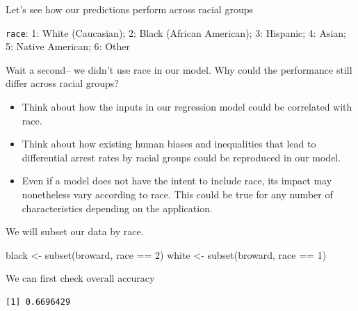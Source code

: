 \documentclass[
  letterpaper,
  DIV=11,
  numbers=noendperiod]{scrreprt}
\newenvironment{Shaded}{\begin{snugshade}}{\end{snugshade}}
\newcommand{\DecValTok}[1]{\textcolor[rgb]{0.68,0.00,0.00}{#1}}
\newcommand{\FunctionTok}[1]{\textcolor[rgb]{0.28,0.35,0.67}{#1}}
\newcommand{\NormalTok}[1]{\textcolor[rgb]{0.00,0.23,0.31}{#1}}
\newcommand{\OtherTok}[1]{\textcolor[rgb]{0.00,0.23,0.31}{#1}}
\newcommand{\SpecialCharTok}[1]{\textcolor[rgb]{0.37,0.37,0.37}{#1}}
\providecommand{\tightlist}{%
  \setlength{\itemsep}{0pt}\setlength{\parskip}{0pt}}\usepackage{longtable,booktabs,array}
\begin{document}
Let's see how our predictions perform across racial groups

\texttt{race}: 1: White (Caucasian); 2: Black (African American); 3:
Hispanic; 4: Asian; 5: Native American; 6: Other

Wait a second-- we didn't use race in our model. Why could the
performance still differ across racial groups?

\begin{itemize}
\tightlist
\item
  Think about how the inputs in our regression model could be correlated
  with race.
\item
  Think about how existing human biases and inequalities that lead to
  differential arrest rates by racial groups could be reproduced in our
  model.
\item
  Even if a model does not have the intent to include race, its impact
  may nonetheless vary according to race. This could be true for any
  number of characteristics depending on the application.
\end{itemize}

We will subset our data by race.

\begin{Shaded}
\begin{Highlighting}[]
\NormalTok{black }\OtherTok{\textless{}{-}} \FunctionTok{subset}\NormalTok{(broward, race }\SpecialCharTok{==} \DecValTok{2}\NormalTok{)}
\NormalTok{white }\OtherTok{\textless{}{-}} \FunctionTok{subset}\NormalTok{(broward, race }\SpecialCharTok{==} \DecValTok{1}\NormalTok{)}
\end{Highlighting}
\end{Shaded}

We can first check overall accuracy

\begin{Shaded}
\end{Shaded}

\begin{verbatim}
[1] 0.6696429
\end{verbatim}

\begin{Shaded}
\end{Shaded}
\end{document}
